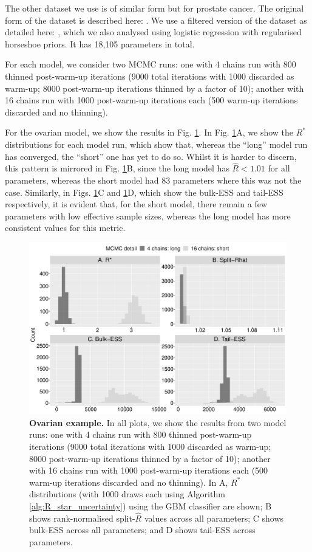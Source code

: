 \documentclass[ba]{imsart}
\numberwithin{equation}{section}
\theoremstyle{plain}
\begin{document}
\begin{supplement}
		The other dataset we use is of similar form but for prostate cancer. The original form of the dataset is described here: \cite{singh2002gene}. We use a filtered version of the dataset as detailed here: \cite{yang2006stable}, which we also analysed using logistic regression with regularised horseshoe priors. It has 18,105 parameters in total. 
		
		For each model, we consider two MCMC runs: one with 4 chains run with 800 thinned post-warm-up iterations (9000 total iterations with 1000 discarded as warm-up; 8000 post-warm-up iterations thinned by a factor of 10); another with 16 chains run with 1000 post-warm-up iterations each (500 warm-up iterations discarded and no thinning).
		
		For the ovarian model, we show the results in Fig. \ref{fig:ovarian}. In Fig. \ref{fig:ovarian}A, we show the $R^*$ distributions for each model run, which show that, whereas the ``long'' model run has converged, the ``short'' one has yet to do so. Whilst it is harder to discern, this pattern is mirrored in Fig. \ref{fig:ovarian}B, since the long model has $\widehat{R}<1.01$ for all parameters, whereas the short model had 83 parameters where this was not the case. Similarly, in Figs. \ref{fig:ovarian}C and \ref{fig:ovarian}D, which show the bulk-ESS and tail-ESS respectively, it is evident that, for the short model, there remain a few parameters with low effective sample sizes, whereas the long model has more consistent values for this metric.
		
		\begin{figure}[!htb]
			\centerline{\includegraphics[width=1.0\textwidth]{ovarian.pdf}}
			\caption{\textbf{Ovarian example.} In all plots, we show the results from two model runs: one with 4 chains run with 800 thinned post-warm-up iterations (9000 total iterations with 1000 discarded as warm-up; 8000 post-warm-up iterations thinned by a factor of 10); another with 16 chains run with 1000 post-warm-up iterations each (500 warm-up iterations discarded and no thinning). In A, $R^*$ distributions (with 1000 draws each using Algorithm \ref{alg:R_star_uncertainty}) using the GBM classifier are shown; B shows rank-normalised split-$\widehat{R}$ values across all parameters; C shows bulk-ESS across all parameters; and D shows tail-ESS across parameters.}
			\label{fig:ovarian}
		\end{figure}
		

\end{supplement}
\end{document}

